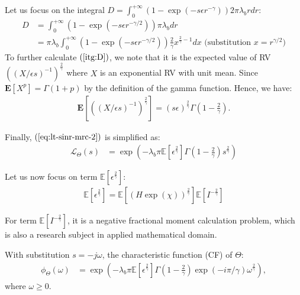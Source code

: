 Let us focus on the integral $D = \int_{0}^{+\infty} \left(1-\exp(-s\epsilon r^{-\gamma} ) \right) 2 \pi \lambda_{b} r dr $:
\begin{align}
	\label{itg:D}
	D &= \int_{0}^{+\infty} \left(1-\exp(-s\epsilon r^{-\gamma/2} ) \right) \pi \lambda_{b} dr \nonumber\\
	&= \pi \lambda_{b} \int_{0}^{+\infty} \left(1-\exp(-s\epsilon r^{-\gamma/2} ) \right) \frac{2}{\gamma} x^{\frac{2}{\gamma}  - 1} dx \text{ (substitution $x = r^{\gamma/2}$)}
\end{align}
To further calculate $(\ref{itg:D})$, we note that it is the expected value of RV $ \left(    (X/\epsilon s) ^{-1} \right)^{\frac{2}{\gamma}} $ where $X$  is an exponential RV with unit mean. Since $\mathbf{E}\left[ X^{p}\right] = \Gamma(1+p)$ by the definition of the gamma function. Hence, we have:
\begin{align}
	\mathbf{E} \left[ \left(    (X/\epsilon s) ^{-1} \right)^{\frac{2}{\gamma}}  \right] = (s \epsilon) ^{\frac{2}{\gamma}} \Gamma (1 - \frac{2}{\gamma}) \nonumber.
\end{align}
 
Finally, $(\ref{eq:lt-sinr-mrc-2})$ is simplified as:
\begin{align}
	\mathcal{L}_{\Theta}\left( s \right) &= \exp(-\lambda_{b} \pi \mathbb{E}\left[ \epsilon ^{\frac{2}{\gamma}} \right]  \Gamma(1-\frac{2}{\gamma}) s^{\frac{2}{\gamma}})
\end{align}

Let us now focus on term $\mathbb{E}\left[ \epsilon ^{\frac{2}{\gamma}} \right] $:
\begin{align}
	\mathbb{E}\left[ \epsilon ^{\frac{2}{\gamma}} \right]  = \mathbb{E}\left[ \left( H \exp(\chi)\right)  ^{\frac{2}{\gamma}} \right] \mathbb{E}\left[ I ^{-\frac{2}{\gamma}}\right] 
\end{align}

For term $\mathbb{E}\left[ I ^{-\frac{2}{\gamma}}\right] $, it is a negative fractional moment calculation problem, which is also a research subject in applied mathematical domain. 

With substitution $s = -j\omega$, the characteristic function (CF) of $\Theta$:
\begin{align}
\phi_{\Theta}\left( \omega \right) &= \exp(-\lambda_{b} \pi \mathbb{E}\left[ \epsilon ^{\frac{2}{\gamma}} \right]  \Gamma(1-\frac{2}{\gamma}) \exp(-i\pi/\gamma) \omega^{\frac{2}{\gamma}}),  
\end{align}
where $\omega \geq 0$.

